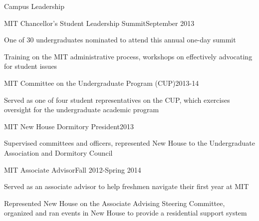 \documentclass{resume} %
\begin{document}

\begin{rSection}{Campus Leadership}

\begin{rSubsection}{MIT Chancellor's Student Leadership Summit}{September 2013}{}{}
\item One of 30 undergraduates nominated to attend this annual one-day summit
\item Training on the MIT administrative process, workshops on effectively advocating for student issues 
\end{rSubsection}

\begin{rSubsection}{MIT Committee on the Undergraduate Program (CUP)}{2013-14}{}{}
\item Served as one of four student representatives on the CUP, which exercises oversight for the undergraduate academic program
\end{rSubsection}

\begin{rSubsection}{MIT New House Dormitory President}{2013}{}{}
\item Supervised committees and officers, represented New House to the Undergraduate Association and Dormitory Council
\end{rSubsection}

\begin{rSubsection}{MIT Associate Advisor}{Fall 2012-Spring 2014}{}{}
\item Served as an associate advisor to help freshmen navigate their first year at MIT
\item Represented New House on the Associate Advising Steering Committee, organized and ran events in New House to provide a residential support system
\end{rSubsection}

\end{rSection}
\end{document}
